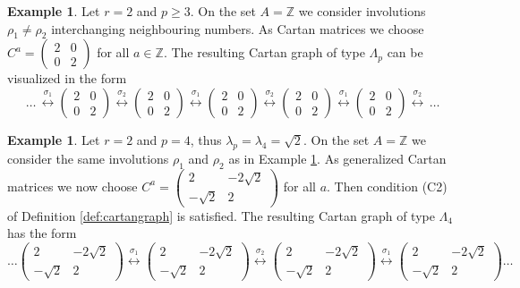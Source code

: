 \documentclass[11pt,a4paper]{amsart}
\theoremstyle{definition}
\newtheorem{Example}[Lemma]{Example}
\numberwithin{equation}{section}
\begin{document}
\begin{Example} \label{ex:2002}
Let $r=2$ and $p\ge 3$.
On the set $A=\mathbb{Z}$ we consider
involutions $\rho_1\neq \rho_2$ interchanging
neighbouring numbers.
As Cartan matrices we choose
$C^a= \begin{pmatrix} 2 & 0 \\ 0 & 2
\end{pmatrix}$ for all $a\in \mathbb{Z}$. 
The resulting Cartan graph of type $\Lambda_p$ can 
be visualized in the form
$$
\ldots \,
\stackrel{\sigma_1}{\longleftrightarrow}
\begin{pmatrix} 2 & 0 \\ 0 & 2 \end{pmatrix}
\stackrel{\sigma_2}{\longleftrightarrow}
\begin{pmatrix} 2 & 0 \\ 0 & 2 \end{pmatrix}
\stackrel{\sigma_1}{\longleftrightarrow}
\begin{pmatrix} 2 & 0 \\ 0 & 2 \end{pmatrix}
\stackrel{\sigma_2}{\longleftrightarrow}
\begin{pmatrix} 2 & 0 \\ 0 & 2 \end{pmatrix}
\stackrel{\sigma_1}{\longleftrightarrow}
\begin{pmatrix} 2 & 0 \\ 0 & 2 \end{pmatrix}
\stackrel{\sigma_2}{\longleftrightarrow}\, \ldots
$$
\end{Example}

\begin{Example} \label{ex:root2}
    Let $r=2$ and $p=4$, thus
    $\lambda_p=\lambda_4 = \sqrt{2}$.
On the set $A=\mathbb{Z}$ we consider
the same involutions $\rho_1$ and $\rho_2$ as in Example \ref{ex:2002}. As generalized 
Cartan matrices we now choose
$C^a= \begin{pmatrix} 2 & -2\sqrt{2} \\ 
-\sqrt{2} & 2
\end{pmatrix}$ for all $a$.
Then condition (C2) of Definition 
\ref{def:cartangraph} is satisfied. 
The resulting Cartan graph of type $\Lambda_4$ 
has the form
$$
\ldots 
\begin{pmatrix} 2 & -2\sqrt{2} \\ 
-\sqrt{2} & 2 \end{pmatrix}
\stackrel{\sigma_1}{\longleftrightarrow}
\begin{pmatrix} 2 & -2\sqrt{2} \\ 
-\sqrt{2} & 2 \end{pmatrix}
\stackrel{\sigma_2}{\longleftrightarrow}
\begin{pmatrix} 2 & -2\sqrt{2} \\ 
-\sqrt{2} & 2 \end{pmatrix}
\stackrel{\sigma_1}{\longleftrightarrow}
\begin{pmatrix} 2 & -2\sqrt{2} \\ 
-\sqrt{2} & 2 \end{pmatrix} \ldots
$$
\end{Example}
\end{document}
